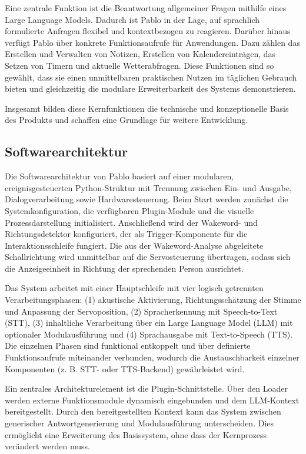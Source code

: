 Eine zentrale Funktion ist die Beantwortung allgemeiner Fragen mithilfe eines Large Language Models. 
Dadurch ist Pablo in der Lage, auf sprachlich formulierte Anfragen flexibel und kontextbezogen zu reagieren. 
Darüber hinaus verfügt Pablo über konkrete Funktionsaufrufe für Anwendungen. 
Dazu zählen das Erstellen und Verwalten von Notizen, Erstellen von Kalendereinträgen, das Setzen von Timern und aktuelle Wetterabfragen. 
Diese Funktionen sind so gewählt, dass sie einen unmittelbaren praktischen Nutzen im täglichen Gebrauch bieten und gleichzeitig die modulare Erweiterbarkeit des Systems demonstrieren. 

Insgesamt bilden diese Kernfunktionen die technische und konzeptionelle Basis des Produkts und schaffen eine Grundlage für weitere Entwicklung.



\subsection{Softwarearchitektur}

Die Softwarearchitektur von Pablo basiert auf einer modularen, ereignisgesteuerten Python-Struktur mit Trennung zwischen Ein- und Ausgabe, Dialogverarbeitung sowie Hardwaresteuerung. 
Beim Start werden zunächst die Systemkonfiguration, die verfügbaren Plugin-Module und die visuelle Prozessdarstellung initialisiert. 
Anschließend wird der Wakeword- und Richtungsdetektor konfiguriert, der als Trigger-Komponente für die Interaktionsschleife fungiert.
Die aus der Wakeword-Analyse abgeleitete Schallrichtung wird unmittelbar auf die Servosteuerung übertragen, sodass sich die Anzeigeeinheit in Richtung der sprechenden Person ausrichtet.

Das System arbeitet mit einer Hauptschleife mit vier logisch getrennten Verarbeitungsphasen: 
(1) akustische Aktivierung, Richtungsschätzung der Stimme und Anpassung der Servoposition, 
(2) Spracherkennung mit Speech-to-Text (STT), 
(3) inhaltliche Verarbeitung über ein Large Language Model (LLM) mit optionaler Modulausführung und
(4) Sprachausgabe mit Text-to-Speech (TTS). 
Die einzelnen Phasen sind funktional entkoppelt und über definierte Funktionsaufrufe miteinander verbunden, wodurch die Austauschbarkeit einzelner Komponenten (z. B. STT- oder TTS-Backend) gewährleistet wird.

Ein zentrales Architekturelement ist die Plugin-Schnittstelle. Über den Loader werden externe Funktionsmodule dynamisch eingebunden und dem LLM-Kontext bereitgestellt. 
Durch den bereitgestellten Kontext kann das System zwischen generischer Antwortgenerierung und Modulausführung unterscheiden. 
Dies ermöglicht eine Erweiterung des Basissystem, ohne dass der Kernprozess verändert werden muss.

